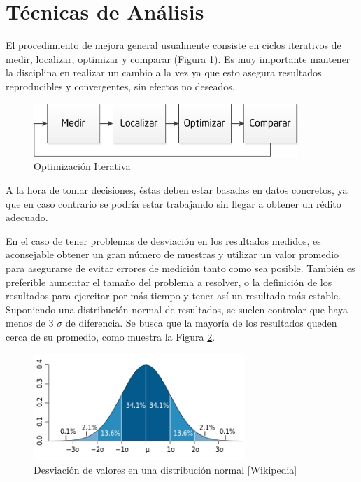 \documentclass[a4paper]{report}
\begin{document}
\section{Técnicas de Análisis}

El procedimiento de mejora general usualmente consiste en ciclos iterativos de medir, localizar, optimizar y
comparar (Figura \ref{fig:cycle}). Es muy importante mantener la disciplina en realizar un cambio a la
vez ya que esto asegura resultados reproducibles y convergentes, sin efectos no deseados.

\begin{figure}[H]
\begin{center}
\includegraphics[width=10cm]{cycle.png}
\caption{Optimización Iterativa}
\label{fig:cycle}
\end{center}
\end{figure}

A la hora de tomar decisiones, éstas deben estar basadas en datos concretos, ya que en caso contrario se podría estar trabajando sin llegar a obtener un rédito adecuado.

\bigskip

En el caso de tener problemas de desviación en los resultados medidos, es aconsejable obtener un gran número de muestras y utilizar un valor promedio para asegurarse de evitar errores de medición tanto como sea posible. También es preferible aumentar el tamaño del problema a resolver, o la definición de los resultados para ejercitar por más tiempo y tener así un resultado más estable.
Suponiendo una distribución normal de resultados, se suelen controlar que haya menos de 3 $ \sigma $ de diferencia. Se busca que la mayoría de los resultados queden cerca de su promedio, como muestra la Figura \ref{fig:deviation}.

\begin{figure}[H]
\centering
\includegraphics[width=8cm]{deviation.png}
\caption{Desviación de valores en una distribución normal [Wikipedia]}
\label{fig:deviation}
\end{figure}
\end{document}
